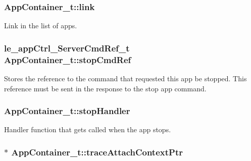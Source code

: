 \subsubsection[{\texorpdfstring{link}{link}}]{ App\+Container\+\_\+t\+::link}\hypertarget{struct_app_container__t_a1129ed203092af7855ec052e86c7107f}{}\label{struct_app_container__t_a1129ed203092af7855ec052e86c7107f}


Link in the list of apps. 

\subsubsection[{\texorpdfstring{stop\+Cmd\+Ref}{stopCmdRef}}]{\setlength{\rightskip}{0pt plus 5cm}le\+\_\+app\+Ctrl\+\_\+\+Server\+Cmd\+Ref\+\_\+t App\+Container\+\_\+t\+::stop\+Cmd\+Ref}\hypertarget{struct_app_container__t_ac8f1ef4d812f5eafc6c274cbef3c5e4d}{}\label{struct_app_container__t_ac8f1ef4d812f5eafc6c274cbef3c5e4d}
Stores the reference to the command that requested this app be stopped. This reference must be sent in the response to the stop app command. 
\subsubsection[{\texorpdfstring{stop\+Handler}{stopHandler}}]{ App\+Container\+\_\+t\+::stop\+Handler}\hypertarget{struct_app_container__t_a579a3e19c2fb22e5b54c724b72be40b1}{}\label{struct_app_container__t_a579a3e19c2fb22e5b54c724b72be40b1}


Handler function that gets called when the app stops. 

\subsubsection[{\texorpdfstring{trace\+Attach\+Context\+Ptr}{traceAttachContextPtr}}]{$\ast$ App\+Container\+\_\+t\+::trace\+Attach\+Context\+Ptr}\hypertarget{struct_app_container__t_a318bc109d60e6bd96c59334290bcb37c}{}\label{struct_app_container__t_a318bc109d60e6bd96c59334290bcb37c}


